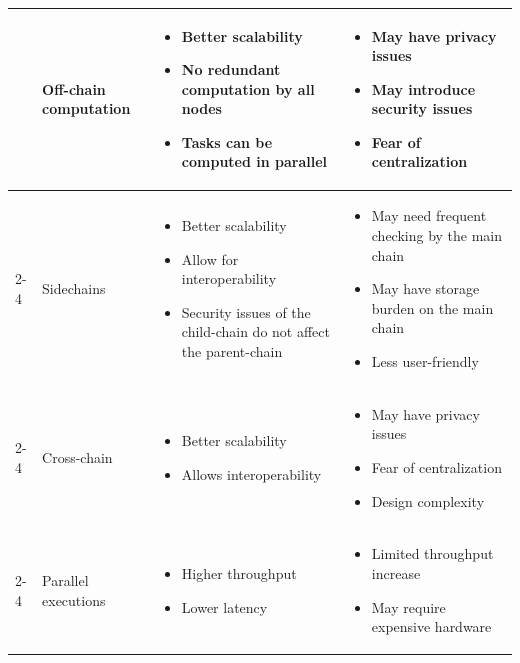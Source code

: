 \begin{table}[htbp]
{\begin{tabularx}{\textwidth}{@{}p{2.4cm} p{2.7cm} >{\raggedright\arraybackslash}X >{\raggedright\arraybackslash}X@{}}
& Off-chain computation &
\begin{itemize}
  \item Better scalability
  \item No redundant computation by all nodes
  \item Tasks can be computed in parallel
\end{itemize} &
\begin{itemize}
  \item May have privacy issues
  \item May introduce security issues
  \item Fear of centralization
\end{itemize} \\ \cmidrule(l){2-4}

& Sidechains &
\begin{itemize}
  \item Better scalability
  \item Allow for interoperability
  \item Security issues of the child-chain do not affect the parent-chain
\end{itemize} &
\begin{itemize}
  \item May need frequent checking by the main chain
  \item May have storage burden on the main chain
  \item Less user-friendly
\end{itemize} \\ \cmidrule(l){2-4}

& Cross-chain &
\begin{itemize}
  \item Better scalability
  \item Allows interoperability
\end{itemize} &
\begin{itemize}
  \item May have privacy issues
  \item Fear of centralization
  \item Design complexity
\end{itemize} \\ \cmidrule(l){2-4}

& Parallel executions &
\begin{itemize}
  \item Higher throughput
  \item Lower latency
\end{itemize} &
\begin{itemize}
  \item Limited throughput increase
  \item May require expensive hardware
\end{itemize} \\ 


\end{tabularx}}
\end{table}

